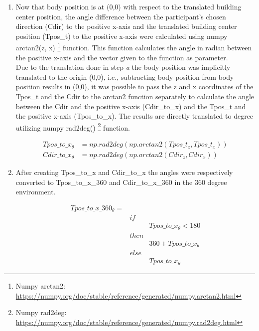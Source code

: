 \begin{enumerate}
\begin{enumerate}
		\item Now that body position is at (0,0) with respect to the translated building center position, the angle difference between the participant's chosen direction {\emphasize(Cdir)} to the positive x-axis and the translated building center position {\emphasize(Tpos\_t)} to the positive x-axis were calculated using numpy arctan2(z, x) \footnote{Numpy arctan2: \href{https://numpy.org/doc/stable/reference/generated/numpy.arctan2.html}{https://numpy.org/doc/stable/reference/generated/numpy.arctan2.html}} function. This function calculates the angle in radian between the positive x-axis and the vector given to the function as parameter. \\
		Due to the translation done in step \emph{a} the body position was implicitly translated to the origin (0,0), i.e., subtracting body position from body position results in (0,0), it was possible to pass the z and x coordinates of the {\emphasize Tpos\_t} and the {\emphasize Cdir} to the arctan2 function separately to calculate the angle between the {\emphasize Cdir} and the positive x-axis {\emphasize (Cdir\_to\_x)} and the {\emphasize Tpos\_t} and the positive x-axis {\emphasize (Tpos\_to\_x)}. The results are directly translated to degree utilizing numpy rad2deg() \footnote{Numpy rad2deg: \href{https://numpy.org/doc/stable/reference/generated/numpy.rad2deg.html}{https://numpy.org/doc/stable/reference/generated/numpy.rad2deg.html}} function.
	
		\begin{align*}
			Tpos\_to\_x_{\theta} & = np.rad2deg(np.arctan2(Tpos\_t_{z}, Tpos\_t_{x})) \\
			Cdir\_to\_x_{\theta} & = np.rad2deg(np.arctan2(Cdir_{z}, Cdir_{x}))
		\end{align*}
		
		\item After creating {\emphasize Tpos\_to\_x} and {\emphasize Cdir\_to\_x} the angles were respectively converted to {\emphasize Tpos\_to\_x\_360} and {\emphasize Cdir\_to\_x\_360} in the 360 degree environment.

		\begin{align*}
			Tpos\_to\_x\_360_{\theta} = & \\
			& if & \\
			&& Tpos\_to\_x_{\theta} < 180 \\
			& then & \\
			&& 360 + Tpos\_to\_x_{\theta} \\
			& else & \\
			&& Tpos\_to\_x_{\theta}
		\end{align*}
	

\end{enumerate}
\end{enumerate}
